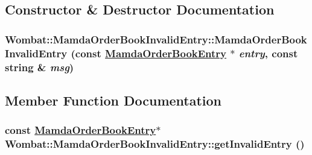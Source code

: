\subsection{Constructor \& Destructor Documentation}
\hypertarget{classWombat_1_1MamdaOrderBookInvalidEntry_864ad9179bf446749e702f2f93811982}{
\subsubsection[MamdaOrderBookInvalidEntry]{\setlength{\rightskip}{0pt plus 5cm}Wombat::Mamda\-Order\-Book\-Invalid\-Entry::Mamda\-Order\-Book\-Invalid\-Entry (const \hyperlink{classWombat_1_1MamdaOrderBookEntry}{Mamda\-Order\-Book\-Entry} $\ast$ {\em entry}, const string \& {\em msg})}}
\label{classWombat_1_1MamdaOrderBookInvalidEntry_864ad9179bf446749e702f2f93811982}




\subsection{Member Function Documentation}
\hypertarget{classWombat_1_1MamdaOrderBookInvalidEntry_fcae5c2846ef5fb1b618d4bb22057bf0}{
\subsubsection[getInvalidEntry]{\setlength{\rightskip}{0pt plus 5cm}const \hyperlink{classWombat_1_1MamdaOrderBookEntry}{Mamda\-Order\-Book\-Entry}$\ast$ Wombat::Mamda\-Order\-Book\-Invalid\-Entry::get\-Invalid\-Entry ()}}
\label{classWombat_1_1MamdaOrderBookInvalidEntry_fcae5c2846ef5fb1b618d4bb22057bf0}


